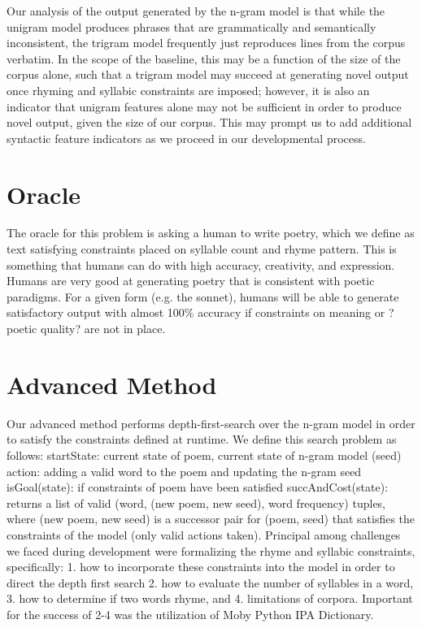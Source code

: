 \documentclass[10pt,twocolumn]{article}
\begin{document}
Our analysis of the output generated by the n-gram model is that while the unigram model produces phrases that are grammatically and semantically inconsistent, the trigram model frequently just reproduces lines from the corpus verbatim. In the scope of the baseline, this may be a function of the size of the corpus alone, such that a trigram model may succeed at generating novel output once rhyming and syllabic constraints are imposed; however, it is also an indicator that unigram features alone may not be sufficient in order to produce novel output, given the size of our corpus. This may prompt us to add additional syntactic feature indicators as we proceed in our developmental process.

\section{Oracle}
The oracle for this problem is asking a human to write poetry, which we define as text satisfying constraints placed on syllable count and rhyme pattern. This is something that humans can do with high accuracy, creativity, and expression. Humans are very good at generating poetry that is consistent with poetic paradigms. For a given form (e.g. the sonnet), humans will be able to generate satisfactory output with almost 100\% accuracy if constraints on meaning or ?poetic quality? are not in place. 

\section{Advanced Method}
Our advanced method performs depth-first-search over the n-gram model in order to satisfy the constraints defined at runtime. We define this search problem as follows:
	startState: current state of poem, current state of n-gram model (seed)
	action: adding a valid word to the poem and updating the n-gram seed
	isGoal(state): if constraints of poem have been satisfied
succAndCost(state): returns a list of valid (word, (new poem, new seed), word frequency) tuples, where (new poem, new seed) is a successor pair for (poem, seed) that satisfies the constraints of the model (only valid actions taken). 
Principal among challenges we faced during development were formalizing the rhyme and syllabic constraints, specifically: 1. how to incorporate these constraints into the model in order to direct the depth first search 2. how to evaluate the number of syllables in a word, 3. how to determine if two words rhyme, and 4. limitations of corpora. Important for the success of 2-4 was the utilization of Moby Python IPA Dictionary. 
\end{document}
